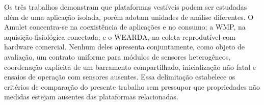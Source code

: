 \documentclass{article}
\begin{document}
Os tr\^es trabalhos demonstram que plataformas vest\'iveis podem ser estudadas al\'em de uma aplica\c{c}\~ao isolada, por\'em adotam unidades de an\'alise diferentes. O Amulet concentra-se na coexist\^encia de aplica\c{c}\~oes e no consumo; a WMP, na aquisi\c{c}\~ao fisiol\'ogica conectada; e o WEARDA, na coleta reprodut\'ivel com hardware comercial. Nenhum deles apresenta conjuntamente, como objeto de avalia\c{c}\~ao, um contrato uniforme para m\'odulos de sensores heterog\^eneos, coordena\c{c}\~ao expl\'icita de um barramento compartilhado, inicializa\c{c}\~ao n\~ao fatal e ensaios de opera\c{c}\~ao com sensores ausentes. Essa delimita\c{c}\~ao estabelece os crit\'erios de compara\c{c}\~ao do presente trabalho sem pressupor que propriedades n\~ao medidas estejam ausentes das plataformas relacionadas.
\end{document}
